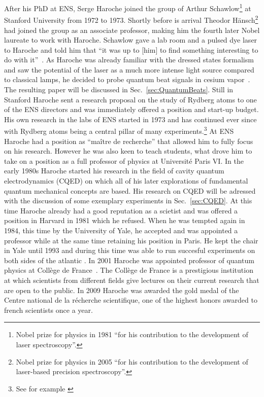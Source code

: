 After his PhD at ENS, Serge Haroche joined the group of Arthur
  Schawlow\footnote{Nobel prize for physics in 1981 ``for his contribution to
  the development of laser spectroscopy''. } at
Stanford University from 1972 to 1973. Shortly before is arrival Theodor
Hänsch\footnote{Nobel prize for physics in 2005 ``for his contribution to the
development of laser-based precision spectroscopy''.}
had joined the group as an associate professor, making him the fourth later
Nobel laureate to work with Haroche. Schawlow gave a lab room and a pulsed dye
laser to Haroche and told him that ``it was up to [him] to find something
interesting to do with it''~\cite{shbio}. As Haroche was already familiar with
the dressed states formalism and saw the potential of the laser as a much more
intense light source compared to classical lamps, he decided to probe
quantum beat signals in  cesium vapor~\cite{haroche1973hyperfine}. The resulting
paper will be discussed in Sec.~\ref{sec:QuantumBeats}. Still in Stanford
Haroche sent a research proposal on the study of Rydberg atoms to one of the ENS
directors and was immediately offered a position and start-up budget. His own
research in the labs of ENS started in 1973 and has continued ever since with
Rydberg atoms being a central pillar of many experiments.\footnote{See for example
\cite{haroche1983EnhancedSpontEm,haroche1990QND,haroche1999SinglePhoton,haroche2007QuantumJumps}}
At ENS Haroche had a position as ``maître de recherche'' that allowed him to
fully focus on his research. However he was also keen to teach students, what
drove him to take on a position as a full professor of physics at Université
Paris VI. In the early 1980s Haroche started his research in the field of cavity
quantum electrodynamics (CQED) on which all of his later explorations of
fundamental quantum mechanical concepts are based. His research on CQED will be
adressed with the discussion of some exemplary experiments in
Sec.~\ref{sec:CQED}. At this time Haroche already had a good reputation as a
scietist and was offered a position in Harvard in 1981 which he refused. When he
was tempted again in 1984, this time by the University of Yale, he accepted and
was appointed a professor while at the same time retaining his position in
Paris. He kept the chair in Yale until 1993 and during this time was able to run
succesful experiments on both sides of the atlantic
\cite{haroche1983EnhancedSpontEm, haroche1987SupressedEmission}. In 2001 Haroche
was appointed professor of quantum physics at Collège de
France~\cite{harocheCollege}. The Collège de France is a prestigious institution
at which scientists from different fields give lectures on their current
research that are open to the public. In 2009 Haroche was awarded the gold medal
of the Centre national de la récherche scientifique, one of the highest honors
awarded to french scientists once a year.

